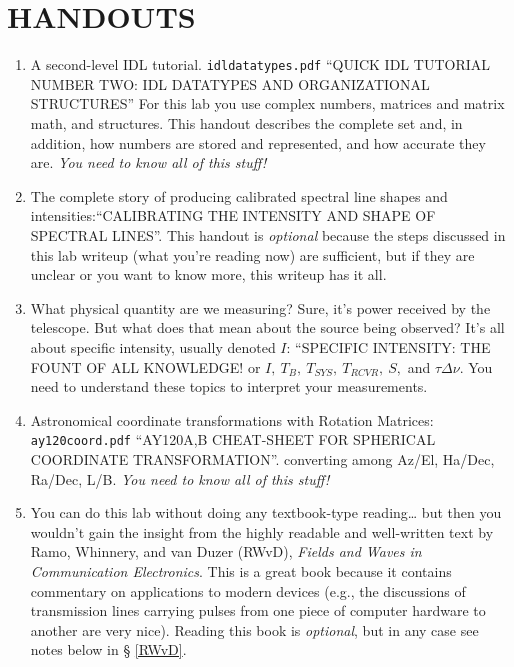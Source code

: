 \documentclass[12pt,preprint]{aastex}
\begin{document}
\section{HANDOUTS} \label{handouts}
\begin{enumerate}
\item A second-level IDL tutorial. {\tt idldatatypes.pdf} ``QUICK IDL
  TUTORIAL NUMBER TWO: IDL DATATYPES AND ORGANIZATIONAL STRUCTURES'' For
  this lab you use complex numbers, matrices and matrix
  math, and structures. This handout describes the complete set and, in
  addition, how numbers are stored and represented, and how accurate
  they are. {\it You need to know all of this stuff!}

\item The complete story of producing calibrated spectral line shapes
  and intensities:``CALIBRATING THE INTENSITY AND SHAPE OF SPECTRAL
  LINES''. This handout is {\it optional} because the steps discussed in
  this lab writeup (what you're reading now) are sufficient, but
  if they are unclear or you want to know more, this writeup has it all.

\item What physical quantity are we measuring? Sure, it's power received
  by the telescope. But what does that mean about the source being
  observed? It's all about specific intensity, usually denoted $I$:
  ``SPECIFIC INTENSITY: THE FOUNT OF ALL KNOWLEDGE! or $I,
    \ T_B, \ T_{SYS}, \ T_{RCVR}, \ S,$ and $\tau \Delta \nu$. You need
  to understand these topics to interpret your measurements.

\item Astronomical coordinate transformations with Rotation Matrices:
  {\tt ay120coord.pdf} ``AY120A,B CHEAT-SHEET FOR SPHERICAL COORDINATE
  TRANSFORMATION''. converting among Az/El, Ha/Dec, Ra/Dec, L/B. {\it
    You need to know all of this stuff!}

\item You can do this lab without doing any textbook-type reading\dots
  but then you wouldn't gain the insight from the highly readable and
  well-written text by Ramo, Whinnery, and van Duzer (RWvD), {\it Fields
    and Waves in Communication Electronics}. This is a great book
  because it contains commentary on applications to modern devices
  (e.g., the discussions of transmission lines carrying pulses from one
  piece of computer hardware to another are very nice).  Reading this
  book is {\it optional}, but in any case see notes below in \S
  \ref{RWvD}.

\end{enumerate}
\end{document}
